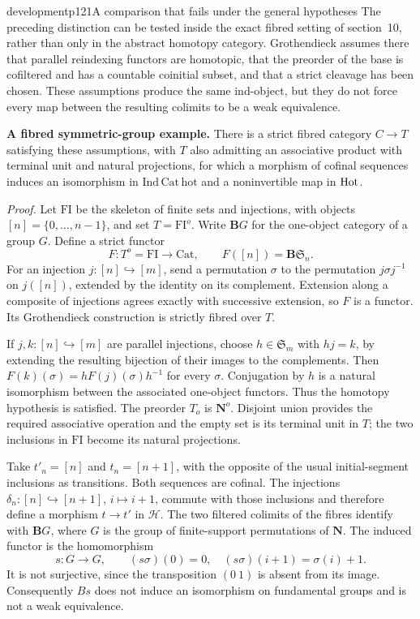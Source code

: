 \begin{dcomment}{development}{p121}{A comparison that fails under the general hypotheses}
The preceding distinction can be tested inside the exact fibred setting of section~10, rather than only in the abstract homotopy category. Grothendieck assumes there that parallel reindexing functors are homotopic, that the preorder of the base is cofiltered and has a countable coinitial subset, and that a strict cleavage has been chosen. These assumptions produce the same ind-object, but they do not force every map between the resulting colimits to be a weak equivalence.

\textbf{A fibred symmetric-group example.}\ours\quad
There is a strict fibred category $C\to T$ satisfying these assumptions, with $T$ also admitting an associative product with terminal unit and natural projections, for which a morphism of cofinal sequences induces an isomorphism in $\mathrm{Ind}\,\mathrm{Cat\,hot}$ and a noninvertible map in $\mathrm{Hot}$.

\textit{Proof.} Let $\mathrm{FI}$ be the skeleton of finite sets and injections, with objects $[n]=\{0,\ldots,n-1\}$, and set $T=\mathrm{FI}^o$. Write $\mathbf B G$ for the one-object category of a group $G$. Define a strict functor
\[
 F:T^o=\mathrm{FI}\longrightarrow\mathrm{Cat},\qquad
 F([n])=\mathbf B\mathfrak S_n.
\]
For an injection $j:[n]\hookrightarrow[m]$, send a permutation $\sigma$ to the permutation $j\sigma j^{-1}$ on $j([n])$, extended by the identity on its complement. Extension along a composite of injections agrees exactly with successive extension, so $F$ is a functor. Its Grothendieck construction is strictly fibred over $T$.

If $j,k:[n]\hookrightarrow[m]$ are parallel injections, choose $h\in\mathfrak S_m$ with $h j=k$, by extending the resulting bijection of their images to the complements. Then
$F(k)(\sigma)=hF(j)(\sigma)h^{-1}$ for every $\sigma$. Conjugation by $h$ is a natural isomorphism between the associated one-object functors. Thus the homotopy hypothesis is satisfied. The preorder $T_o$ is $\mathbf N^o$. Disjoint union provides the required associative operation and the empty set is its terminal unit in $T$; the two inclusions in $\mathrm{FI}$ become its natural projections.

Take $t'_n=[n]$ and $t_n=[n+1]$, with the opposite of the usual initial-segment inclusions as transitions. Both sequences are cofinal. The injections
$\delta_n:[n]\hookrightarrow[n+1]$, $i\mapsto i+1$, commute with those inclusions and therefore define a morphism $t\to t'$ in $\mathcal H$. The two filtered colimits of the fibres identify with $\mathbf B G$, where $G$ is the group of finite-support permutations of $\mathbf N$. The induced functor is the homomorphism
\[
 s:G\longrightarrow G,\qquad
 (s\sigma)(0)=0,\quad(s\sigma)(i+1)=\sigma(i)+1.
\]
It is not surjective, since the transposition $(0\ 1)$ is absent from its image. Consequently $Bs$ does not induce an isomorphism on fundamental groups and is not a weak equivalence.


\end{dcomment}
